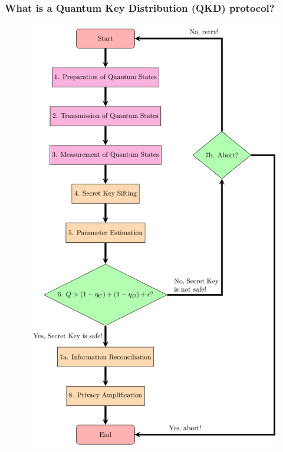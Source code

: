 \documentclass{beamer}
\begin{document}
    \begin{frame}
        \frametitle{\large What is a Quantum Key Distribution (QKD) protocol?}

        \vspace{4ex}
        \begin{figure}
            \centering
            \begin{minipage}{0.4\textwidth}
                \centering
                \includegraphics[width=1.0\linewidth, height=0.75\textheight]{figures/presentation/pdf/qkd-protocol-flowchart.pdf}
                \vspace{-4ex}

\end{minipage}
\end{figure}
\end{frame}
\end{document}
